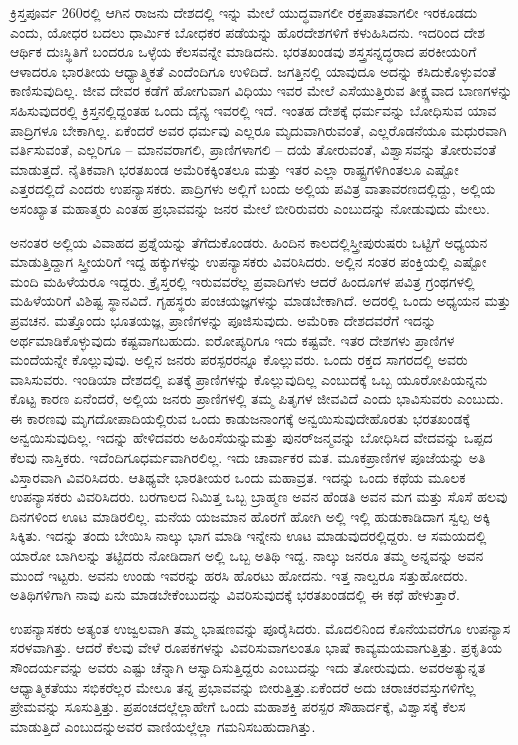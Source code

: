 ಕ್ರಿಸ್ತಪೂರ್ವ 260ರಲ್ಲಿ ಆಗಿನ ರಾಜನು ದೇಶದಲ್ಲಿ ಇನ್ನು ಮೇಲೆ ಯುದ್ಧವಾಗಲೀ ರಕ್ತಪಾತವಾಗಲೀ ಇರಕೂಡದು ಎಂದು, ಯೋಧರ ಬದಲು ಧಾರ್ಮಿಕ ಬೋಧಕರ ಪಡೆಯನ್ನು ಹೊರದೇಶಗಳಿಗೆ ಕಳುಹಿಸಿದನು. ಇದರಿಂದ ದೇಶ ಆರ್ಥಿಕ ದುಃಸ್ಥಿತಿಗೆ ಬಂದರೂ ಒಳ್ಳೆಯ ಕೆಲಸವನ್ನೇ ಮಾಡಿದನು. ಭರತಖಂಡವು ಶಸ್ತ್ರಸನ್ನದ್ಧರಾದ ಪರಕೀಯರಿಗೆ ಆಳಾದರೂ ಭಾರತೀಯ ಆಧ್ಯಾತ್ಮಿಕತೆ ಎಂದೆಂದಿಗೂ ಉಳಿದಿದೆ. ಜಗತ್ತಿನಲ್ಲಿ ಯಾವುದೂ ಅದನ್ನು ಕಸಿದುಕೊಳ್ಳುವಂತೆ ಕಾಣಿಸುವುದಿಲ್ಲ. ಜೀವ ದೇವರ ಕಡೆಗೆ ಹೋಗುವಾಗ ವಿಧಿಯು ಇವರ ಮೇಲೆ ಎಸೆಯುತ್ತಿರುವ ತೀಕ್ಷ್ಣವಾದ ಬಾಣಗಳನ್ನು ಸಹಿಸುವುದರಲ್ಲಿ ಕ್ರಿಸ್ತನಲ್ಲಿದ್ದಂತಹ ಒಂದು ದೈನ್ಯ ಇವರಲ್ಲಿ ಇದೆ. ಇಂತಹ ದೇಶಕ್ಕೆ ಧರ್ಮವನ್ನು ಬೋಧಿಸುವ ಯಾವ ಪಾದ್ರಿಗಳೂ ಬೇಕಾಗಿಲ್ಲ. ಏಕೆಂದರೆ ಅವರ ಧರ್ಮವು ಎಲ್ಲರೂ ಮೃದುವಾಗಿರುವಂತೆ, ಎಲ್ಲರೊಡನೆಯೂ ಮಧುರವಾಗಿ ವರ್ತಿಸುವಂತೆ, ಎಲ್ಲರಿಗೂ – ಮಾನವರಾಗಲಿ, ಪ್ರಾಣಿಗಳಾಗಲಿ – ದಯೆ ತೋರುವಂತೆ, ವಿಶ್ವಾಸವನ್ನು ತೋರುವಂತೆ ಮಾಡುತ್ತದೆ. ನೈತಿಕವಾಗಿ ಭರತಖಂಡ ಅಮೆರಿಕಕ್ಕಿಂತಲೂ ಮತ್ತು ಇತರ ಎಲ್ಲಾ ರಾಷ್ಟ್ರಗಳಿಗಿಂತಲೂ ಎಷ್ಟೋ ಎತ್ತರದಲ್ಲಿದೆ ಎಂದರು ಉಪನ್ಯಾಸಕರು. ಪಾದ್ರಿಗಳು ಅಲ್ಲಿಗೆ ಬಂದು ಅಲ್ಲಿಯ ಪವಿತ್ರ ವಾತಾವರಣದಲ್ಲಿದ್ದು, ಅಲ್ಲಿಯ ಅಸಂಖ್ಯಾತ ಮಹಾತ್ಮರು ಎಂತಹ ಪ್ರಭಾವವನ್ನು ಜನರ ಮೇಲೆ ಬೀರಿರುವರು ಎಂಬುದನ್ನು ನೋಡುವುದು ಮೇಲು.

ಅನಂತರ ಅಲ್ಲಿಯ ವಿವಾಹದ ಪ್ರಶ್ನೆಯನ್ನು ತೆಗೆದುಕೊಂಡರು. ಹಿಂದಿನ ಕಾಲದಲ್ಲಿ\break ಸ್ತ್ರೀಪುರುಷರು ಒಟ್ಟಿಗೆ ಅಧ್ಯಯನ ಮಾಡುತ್ತಿದ್ದಾಗ ಸ್ತ್ರೀಯರಿಗೆ ಇದ್ದ ಹಕ್ಕುಗಳನ್ನು ಉಪನ್ಯಾಸಕರು ವಿವರಿಸಿದರು. ಅಲ್ಲಿನ ಸಂತರ ಪಂಕ್ತಿಯಲ್ಲಿ ಎಷ್ಟೋ ಮಂದಿ ಮಹಿಳೆಯರೂ ಇದ್ದರು. ಕ್ರೈಸ್ತರಲ್ಲಿ ಇರುವವರೆಲ್ಲ ಪ್ರವಾದಿಗಳು ಆದರೆ ಹಿಂದೂಗಳ ಪವಿತ್ರ ಗ್ರಂಥಗಳಲ್ಲಿ ಮಹಿಳೆಯರಿಗೆ ವಿಶಿಷ್ಟ ಸ್ಥಾನವಿದೆ. ಗೃಹಸ್ಥರು ಪಂಚಯಜ್ಞಗಳನ್ನು ಮಾಡಬೇಕಾಗಿದೆ. ಅದರಲ್ಲಿ ಒಂದು ಅಧ್ಯಯನ ಮತ್ತು ಪ್ರವಚನ. ಮತ್ತೊಂದು ಭೂತಯಜ್ಞ, ಪ್ರಾಣಿಗಳನ್ನು ಪೂಜಿಸುವುದು. ಅಮೆರಿಕಾ ದೇಶದವರೆಗೆ ಇದನ್ನು ಅರ್ಥಮಾಡಿಕೊಳ್ಳುವುದು ಕಷ್ಟವಾಗಬಹುದು. ಐರೋಪ್ಯರಿಗೂ ಇದು ಕಷ್ಟವೇ. ಇತರ ದೇಶಗಳು ಪ್ರಾಣಿಗಳ ಮಂದೆಯನ್ನೇ ಕೊಲ್ಲುವುವು. ಅಲ್ಲಿನ ಜನರು ಪರಸ್ಪರರನ್ನೂ ಕೊಲ್ಲುವರು. ಒಂದು ರಕ್ತದ ಸಾಗರದಲ್ಲಿ ಅವರು ವಾಸಿಸುವರು. ಇಂಡಿಯಾ ದೇಶದಲ್ಲಿ ಏತಕ್ಕೆ ಪ್ರಾಣಿಗಳನ್ನು ಕೊಲ್ಲುವುದಿಲ್ಲ ಎಂಬುದಕ್ಕೆ ಒಬ್ಬ ಯೂರೋಪಿಯನ್ನನು ಕೊಟ್ಟ ಕಾರಣ ಏನೆಂದರೆ, ಅಲ್ಲಿಯ ಜನರು ಪ್ರಾಣಿಗಳಲ್ಲಿ ತಮ್ಮ ಪಿತೃಗಳ ಜೀವವಿದೆ ಎಂದು ಭಾವಿಸುವರು ಎಂಬುದು. ಈ ಕಾರಣವು ಮೃಗದೋಪಾದಿಯಲ್ಲಿರುವ ಒಂದು ಕಾಡುಜನಾಂಗಕ್ಕೆ ಅನ್ವಯಿಸುವುದೇ\break ಹೊರತು ಭರತಖಂಡಕ್ಕೆ ಅನ್ವಯಿಸುವುದಿಲ್ಲ. ಇದನ್ನು ಹೇಳಿದವರು ಅಹಿಂಸೆಯನ್ನು\break ಮತ್ತು ಪುನರ್​ಜನ್ಮವನ್ನು ಬೋಧಿಸಿದ ವೇದವನ್ನು ಒಪ್ಪದ ಕೆಲವು ನಾಸ್ತಿಕರು. ಇದೆಂದಿಗೂ\break ಧರ್ಮವಾಗಿರಲಿಲ್ಲ. ಇದು ಚಾರ್ವಾಕರ ಮತ. ಮೂಕಪ್ರಾಣಿಗಳ ಪೂಜೆಯನ್ನು ಅತಿ ವಿಸ್ತಾರವಾಗಿ ವಿವರಿಸಿದರು. ಆತಿಥ್ಯವೇ ಭಾರತೀಯರ ಒಂದು ಮಹಾವ್ರತ. ಇದನ್ನು ಒಂದು ಕಥೆಯ ಮೂಲಕ ಉಪನ್ಯಾಸಕರು ವಿವರಿಸಿದರು. ಬರಗಾಲದ ನಿಮಿತ್ತ ಒಬ್ಬ ಬ್ರಾಹ್ಮಣ ಅವನ ಹೆಂಡತಿ ಅವನ ಮಗ ಮತ್ತು ಸೊಸೆ ಹಲವು ದಿನಗಳಿಂದ ಊಟ ಮಾಡಿರಲಿಲ್ಲ. ಮನೆಯ ಯಜಮಾನ ಹೊರಗೆ ಹೋಗಿ ಅಲ್ಲಿ ಇಲ್ಲಿ ಹುಡುಕಾಡಿದಾಗ ಸ್ವಲ್ಪ ಅಕ್ಕಿ ಸಿಕ್ಕಿತು. ಇದನ್ನು ತಂದು ಬೇಯಿಸಿ ನಾಲ್ಕು ಭಾಗ ಮಾಡಿ ಇನ್ನೇನು ಊಟ ಮಾಡುವುದರಲ್ಲಿದ್ದರು. ಆ ಸಮಯದಲ್ಲಿ ಯಾರೋ ಬಾಗಿಲನ್ನು ತಟ್ಟಿದರು ನೋಡಿದಾಗ ಅಲ್ಲಿ ಒಬ್ಬ ಅತಿಥಿ ಇದ್ದ. ನಾಲ್ಕು ಜನರೂ ತಮ್ಮ ಅನ್ನವನ್ನು ಅವನ ಮುಂದೆ ಇಟ್ಟರು. ಅವನು ಉಂಡು ಇವರನ್ನು ಹರಸಿ ಹೊರಟು ಹೋದನು. ಇತ್ತ ನಾಲ್ವರೂ ಸತ್ತುಹೋದರು. ಅತಿಥಿಗಳಿಗಾಗಿ ನಾವು ಏನು ಮಾಡಬೇಕೆಂಬುದನ್ನು ವಿವರಿಸುವುದಕ್ಕೆ ಭರತಖಂಡದಲ್ಲಿ ಈ ಕಥೆ ಹೇಳುತ್ತಾರೆ.

ಉಪನ್ಯಾಸಕರು ಅತ್ಯಂತ ಉಜ್ವಲವಾಗಿ ತಮ್ಮ ಭಾಷಣವನ್ನು ಪೂರೈಸಿದರು. ಮೊದಲಿನಿಂದ ಕೊನೆಯವರೆಗೂ ಉಪನ್ಯಾಸ ಸರಳವಾಗಿತ್ತು. ಆದರೆ ಕೆಲವು ವೇಳೆ ರೂಪಕಗಳನ್ನು ವಿವರಿಸುವಾಗಲಂತೂ ಭಾಷೆ ಕಾವ್ಯಮಯವಾಗುತ್ತಿತ್ತು. ಪ್ರಕೃತಿಯ ಸೌಂದರ್ಯವನ್ನು ಅವರು ಎಷ್ಟು ಚೆನ್ನಾಗಿ ಆಸ್ವಾದಿಸುತ್ತಿದ್ದರು ಎಂಬುದನ್ನು ಇದು ತೋರುವುದು. ಅವರ\break ಅತ್ಯುನ್ನತ ಆಧ್ಯಾತ್ಮಿಕತೆಯು ಸಭಿಕರೆಲ್ಲರ ಮೇಲೂ ತನ್ನ ಪ್ರಭಾವವನ್ನು ಬೀರುತ್ತಿತ್ತು.\break ಏಕೆಂದರೆ ಅದು ಚರಾಚರವಸ್ತುಗಳಿಗೆಲ್ಲ ಪ್ರೇಮವನ್ನು ಸೂಸುತ್ತಿತ್ತು. ಪ್ರಪಂಚದಲ್ಲೆಲ್ಲಾ\break ಹೇಗೆ ಒಂದು ಮಹಾಶಕ್ತಿ ಪರಸ್ಪರ ಸೌಹಾರ್ದಕ್ಕೆ, ವಿಶ್ವಾಸಕ್ಕೆ ಕೆಲಸ ಮಾಡುತ್ತಿದೆ ಎಂಬುದನ್ನು\break ಅವರ ವಾಣಿಯಲ್ಲೆಲ್ಲಾ ಗಮನಿಸಬಹುದಾಗಿತ್ತು.

